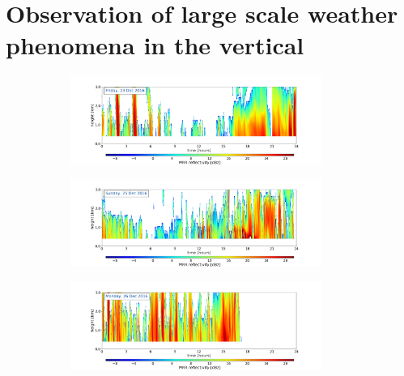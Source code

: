 \section{Observation of large scale weather phenomena in the vertical}\label{sec:res:verticalSWC}
\begin{figure}[h!]
	\centering
	\begin{subfigure}[t]{\textwidth}
		\centering
		\includegraphics[trim={4.cm 2.5cm 4.5cm 1.5cm},clip,width=0.9\textwidth]{./fig_MRR_refl/MRR_20161223}
		\caption{}\label{fig:ret:refl23}
	\end{subfigure}
	\begin{subfigure}[t]{\textwidth}
		\centering
		\includegraphics[trim={4.cm 2.5cm 4.5cm 1.5cm},clip,width=0.9\textwidth]{./fig_MRR_refl/MRR_20161225}
		\caption{}\label{fig:ret:refl25}
	\end{subfigure}
	\begin{subfigure}[t]{\textwidth}
		\centering
		\includegraphics[trim={4.cm 2.5cm 4.5cm 1.5cm},clip,width=0.9\textwidth]{./fig_MRR_refl/MRR_20161226}

\end{subfigure}
\end{figure}
